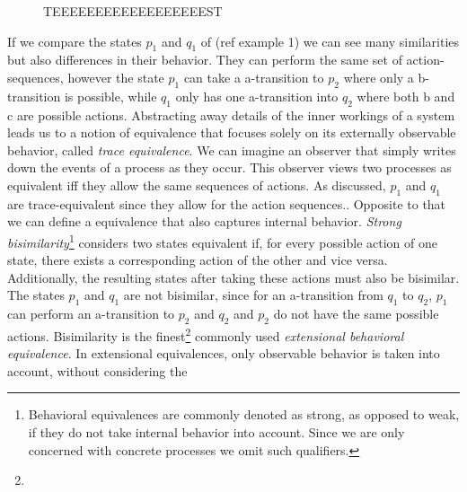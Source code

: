 \begin{isabellebody}
\begin{isamarkuptext}
\begin{figure}[htbp]
\caption{TEEEEEEEEEEEEEEEEEEST}
    \label{fig:your_label}
\end{figure}%
\end{isamarkuptext}\isamarkuptrue%
%
\begin{isamarkuptext}%
If we compare the states $p_1$ and $q_1$ of (ref example 1) we can see many similarities but also differences in their behavior.
They can perform the same set of action-sequences, however the state $p_1$ can take a a-transition to $p_2$ where only a b-transition is possible, 
while $q_1$ only has one a-transition into $q_2$ where both b and c are possible actions.
Abstracting away details of the inner workings of a system leads us to a notion of equivalence that focuses solely on its externally observable behavior, called \textit{trace equivalence}. 
We can imagine an observer that simply writes down the events of a process as they occur. 
This observer views two processes as equivalent iff they allow the same sequences of actions. As discussed, $p_1$ and $q_1$ are trace-equivalent since they allow for the action sequences..
Opposite to that we can define a equivalence that also captures internal behavior. \textit{Strong bisimilarity}\footnote{Behavioral equivalences are commonly denoted as strong, as opposed to weak, if they do not take internal behavior into account. Since we are only concerned with concrete processes we omit such qualifiers.} considers two states equivalent if, 
for every possible action of one state, there exists a corresponding action of the other and vice versa. 
Additionally, the resulting states after taking these actions must also be bisimilar. The states $p_1$ and $q_1$ are not bisimilar, since for an a-transition from $q_1$ to $q_2$, $p_1$ can perform an a-transition to $p_2$
and $q_2$ and $p_2$ do not have the same possible actions. Bisimilarity is the finest\footnote{} commonly used \textit{extensional behavioral equivalence}.
In extensional equivalences, only observable behavior is taken into account, without considering the

\end{isamarkuptext}
\end{isabellebody}
